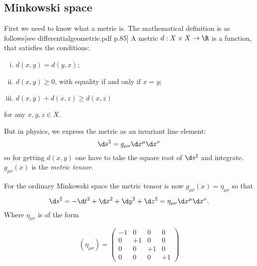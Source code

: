 \subsection{Minkowski space \checkmark}
	First we need to know what a metric is. 
	The mathematical definition is as follows[see differentialgeometrie.pdf p.85] 
	A metric
	$ d:X\times X \rightarrow \R$ is a function, that satisfies the conditions:
		\begin{enumerate}[(i)]
			\item $d(x,y)=d(y,x)$;
			\item $d(x,y)\geq 0$, with equality if and only if $x=y$;
			\item $d(x,y)+d(x,z)\geq d(x,z)$
		\end{enumerate}
	for any $x,y,z \in X$.
	 
	But in physics, we express the metric as an invariant line element:
		\begin{equation}
		 	\d s^2 = g_{\mu\nu} \d x^\mu \d x^\nu
		\end{equation}
			so for getting $d(x,y)$ one have to take the square root of $\d s^2$ and integrate. $g_{\mu\nu}(x)$ is the \textit{metric tensor}.
	 
	 For the ordinary Minkowski space the metric tensor is now $g_{\mu\nu}(x) = \eta_{\mu\nu}$
	 so that
		\begin{equation}
			\d s^2=- \d t^2 + \d x^2 + \d y^2 + \d z^2 = \eta_{\mu\nu} \d x^\mu \d x^\nu.
		\end{equation}
	Where $\eta_{\mu\nu}$ is of the form

		\begin{equation}
		    \left(\eta_{\mu\nu}\right)=
		    \left(\begin{array}{cccc}
		    	-1 & 0 & 0 & 0\\
		    	0 & +1 & 0 & 0\\
		    	0 & 0 & +1 & 0\\
		    	0 & 0 & 0 & +1
			\end{array}\right)
		\end{equation}
	 
